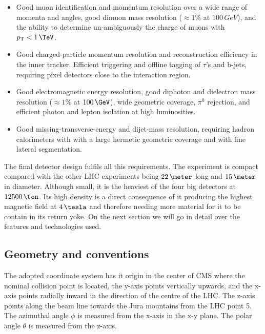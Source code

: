 \begin{itemize}
  \item Good muon identification and momentum resolution over a wide range of momenta and angles, good dimuon mass resolution ($\approx 1\%$ at $100\,GeV$), and the ability to determine un-ambiguously the charge of muons with $\pt<1\,\TeV$.
  \item Good charged-particle momentum resolution and reconstruction efficiency in the inner tracker. Efficient triggering and offline tagging of $\tau$'s and b-jets, requiring pixel detectors close to the interaction region.
  \item Good electromagnetic energy resolution, good diphoton and dielectron mass resolution ($\approx 1\%$ at $100\,\GeV$), wide geometric coverage, $\pi^0$ rejection, and efficient photon and lepton isolation at high luminosities.
  \item Good missing-transverse-energy and dijet-mass resolution, requiring hadron calorimeters with with a large hermetic geometric coverage and with fine lateral segmentation.
\end{itemize}

The final detector design fulfils all this requirements. The experiment is compact compared with the other \gls{LHC} experiments being $22\,\meter$ long and $15\,\meter$ in diameter. Although small, it is the heaviest of the four big detectors at $12500\,\ton$. Its high density is a direct consequence of it producing the highest magnetic field at $4\,\tesla$ and therefore needing more material for it to be contain in its return yoke. On the next section we will go in detail over the features and technologies used.

\subsection{Geometry and conventions}


The adopted coordinate system has it origin in the center of \gls{CMS} where the nominal collision point is located, the y-axis points vertically upwards, and the x-axis points radially inward in the direction of the centre of the \gls{LHC}. The z-axis points along the beam line towards the Jura mountains from the \gls{LHC} point 5. The azimuthal angle $\phi$ is measured from the x-axis in the x-y plane. The polar angle $\theta$ is measured from the z-axis.

